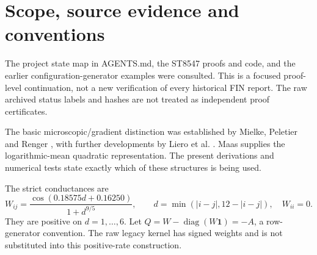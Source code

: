 \documentclass[11pt,a4paper]{article}
\newcommand{\one}{\mathbf1}
\newcommand{\diag}{\operatorname{diag}}
\begin{document}
\begin{abstract}
The logarithmic mean gives a valid quadratic Onsager representation of
finite graph heat flow. Independent continuous-time Markov walkers with the
same conductances instead yield a nonquadratic fluctuation action with a
cosh dissipation potential. Both have the same mean current and the same
time-reversal cost asymmetry. Their local variances differ by
\(z\coth z\ge1\), where \(z\) is half the log population ratio.
For the explicit strict FIN test the ratio is \(1.4683539294\).
The quadratic prescription even violates the variance lower bound for
integer-valued Markov counts when \(|\log(a/b)|>2\).

The exact jump action contracts under summing fine channels for arbitrary
positive hidden conditional distributions. Its covariance also projects
exactly. This differs from the quadratic Onsager equality criterion in
ST8547, which requires independence. Thus a defect of one gradient metric
does not imply failure of exact stochastic coarse-graining.

All conclusions are conditional on supplied rates and a microscopic counting
model. The underlying nonquadratic gradient structure is established
literature. This study provides a checked application, a counting test and
corrections to FIN's interpretation; it makes no claim of new fundamental
physics or mathematical priority.
\end{abstract}

\tableofcontents\newpage

\section{Scope, source evidence and conventions}

The project state map in AGENTS.md, the ST8547 proofs and code, and the
earlier configuration-generator examples were consulted. This is a focused
proof-level continuation, not a new verification of every historical FIN
report. The raw archived status labels and hashes are not treated as
independent proof certificates.

The basic microscopic/gradient distinction was established by Mielke,
Peletier and Renger \cite{mpr}, with further developments by Liero et al.
\cite{lmpr}. Maas \cite{maas} supplies the logarithmic-mean quadratic
representation. The present derivations and numerical tests state exactly
which of these structures is being used.

The strict conductances are
\[
W_{ij}=\frac{\cos(0.18575d+0.16250)}{1+d^{9/5}},\qquad
d=\min(|i-j|,12-|i-j|),\quad W_{ii}=0.
\]
They are positive on \(d=1,\ldots,6\). Let
\(Q=W-\diag(W\one)=-A\), a row-generator convention.
The raw legacy kernel has signed weights and is not substituted into this
positive-rate construction.
\end{document}
